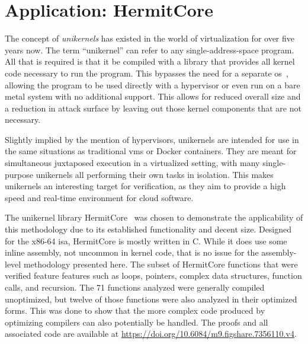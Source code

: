 \section{Application: HermitCore}\label{se:cfg_application}
The concept of \emph{unikernels} has existed in the world of virtualization
for over five years now.
The term ``unikernel'' can refer to any single-address-space program.
All that is required is that it be compiled with a library
that provides all kernel code necessary to run the program.
This bypasses the need for a separate \ac{os}~\citep{madhavapeddy2014unikernels},
allowing the program to be used directly with a hypervisor
or even run on a bare metal system with no additional support.
This allows for reduced overall size and a reduction in attack surface
by leaving out those kernel components that are not necessary.

Slightly implied by the mention of hypervisors,
unikernels are intended for use in the same situations as traditional \acp{vm}
or Docker containers.
They are meant for simultaneous juxtaposed execution in a virtualized setting,
with many single-purpose unikernels all performing their own tasks in isolation.
This makes unikernels an interesting target for verification,
as they aim to provide a high speed and real-time environment for cloud software.

The unikernel library HermitCore~\citep{lankes2016hermitcore} was chosen
to demonstrate the applicability of this methodology
due to its established functionality and decent size.
Designed for the x86-64 \ac{isa}, HermitCore is mostly written in C.
While it does use some inline assembly, not uncommon in kernel code,
that is no issue for the assembly-level methodology presented here.
The subset of HermitCore functions that were verified feature features
such as loops, pointers, complex data structures, function calls, and recursion.
The 71 functions analyzed were generally compiled unoptimized,
but twelve of those functions were also analyzed in their optimized forms.
This was done to show that the more complex code produced by optimizing compilers
can also potentially be handled.
The proofs and all associated code
are available at \url{https://doi.org/10.6084/m9.figshare.7356110.v4}.

